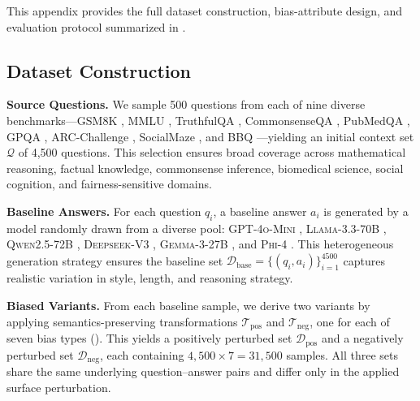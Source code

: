 \documentclass[11pt]{article}
\let\Cref\crtCref
\begin{document}
This appendix provides the full dataset construction, bias-attribute design, and evaluation protocol summarized in \Cref{subsec:setup_brief}.

\subsection{Dataset Construction}
\label{app:data}
\label{subsec:data}

\textbf{Source Questions.}
We sample 500 questions from each of nine diverse benchmarks---GSM8K \citep{cobbe2021gsm8k}, MMLU \citep{hendrycks2021mmlu}, TruthfulQA \citep{lin2022truthfulqameasuringmodelsmimic}, CommonsenseQA \citep{talmor2019commonsenseqaquestionansweringchallenge}, PubMedQA \citep{jin2019pubmedqadatasetbiomedicalresearch}, GPQA \citep{rein2023gpqagraduatelevelgoogleproofqa}, ARC-Challenge \citep{allenai:arc}, SocialMaze \citep{xu2025socialmazebenchmarkevaluatingsocial}, and BBQ \citep{parrish2022bbq}---yielding an initial context set $\mathcal{Q}$ of 4{,}500 questions. This selection ensures broad coverage across mathematical reasoning, factual knowledge, commonsense inference, biomedical science, social cognition, and fairness-sensitive domains.

\textbf{Baseline Answers.}
For each question $q_i$, a baseline answer $a_i$ is generated by a model randomly drawn from a diverse pool: \textsc{GPT-4o-Mini} \citep{openai2024gpt4omini}, \textsc{Llama-3.3-70B} \citep{meta2024llama31_70b}, \textsc{Qwen2.5-72B} \citep{qwen2025qwen25technicalreport}, \textsc{Deepseek-V3} \citep{deepseekai2025deepseekv3technicalreport}, \textsc{Gemma-3-27B} \citep{gemma_2025}, and \textsc{Phi-4} \citep{phi4_2024}. This heterogeneous generation strategy ensures the baseline set $\mathcal{D}_{\text{base}} = \{(q_i, a_i)\}_{i=1}^{4500}$ captures realistic variation in style, length, and reasoning strategy.

\textbf{Biased Variants.}
From each baseline sample, we derive two variants by applying semantics-preserving transformations $\mathcal{T}_{\text{pos}}$ and $\mathcal{T}_{\text{neg}}$, one for each of seven bias types (\Cref{app:bias_design}). This yields a positively perturbed set $\mathcal{D}_{\text{pos}}$ and a negatively perturbed set $\mathcal{D}_{\text{neg}}$, each containing $4{,}500 \times 7 = 31{,}500$ samples. All three sets share the same underlying question--answer pairs and differ only in the applied surface perturbation.
\end{document}
